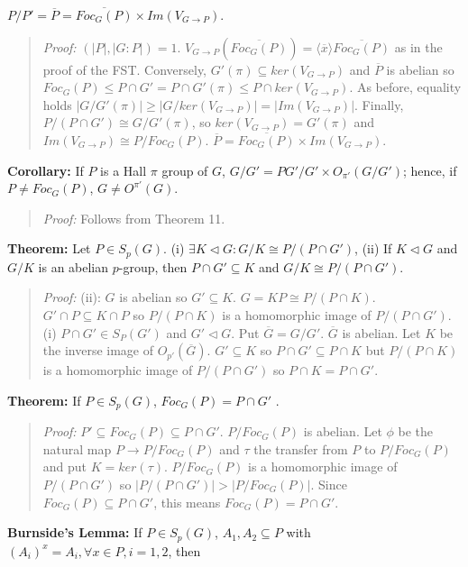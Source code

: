 $P/P' = {\overline P} = {\overline {Foc_G(P)}} \times Im(V_{G \rightarrow P})$.
\begin{quote}
\emph{Proof:}  $(|P|,|G:P|) = 1$.
$V_{G \rightarrow P} ({\overline {Foc_G(P)}}) = \langle {\overline x} \rangle {\overline {Foc_G(P)}}$ as in the
proof of the FST.  Conversely, $G'(\pi) \subseteq ker(V_{G \rightarrow P})$ and ${\overline P}$ is abelian so
$Foc_G(P) \leq P \cap G' = P \cap G'(\pi) \leq P \cap ker(V_{G \rightarrow P})$.  As before, equality holds 
$|G/G'(\pi)| \geq |G/ker(V_{G \rightarrow P})| = |Im(V_{G\rightarrow P})|$.
Finally, $P/(P \cap G') \cong G/G'(\pi)$,
so $ker(V_{G \rightarrow P}) = G'(\pi)$ and $Im(V_{G \rightarrow P}) \cong P/Foc_G(P)$.
${\overline P} = {\overline {Foc_G(P)}} \times Im(V_{G \rightarrow P})$.
\end{quote}
{\bf Corollary:} If $P$ is a Hall $\pi$
group of $G$, $G/G'= PG'/G' \times O_{\pi'}(G/G')$; hence, if $P \ne Foc_G(P)$,
$G \ne O^{\pi'}(G)$.
\begin{quote}
\emph{Proof:}  
Follows from Theorem 11.
\end{quote}
{\bf Theorem:}  Let $P \in S_p(G)$.  (i) $\exists K \lhd G: G/K \cong P/(P \cap G')$, (ii) If
$K \lhd G$ and $G/K$ is an abelian $p$-group, then $P \cap G' \subseteq K$ and $G/K \cong P/(P \cap G')$.
\begin{quote}
\emph{Proof:}
(ii): $G$ is abelian so $G' \subseteq K$.  $G=KP \cong P/(P \cap K)$. $G' \cap P \subseteq K \cap P$ so
$P/(P \cap K)$ is a homomorphic image of $P/(P \cap G')$. \\
(i) $P \cap G' \in S_P(G')$ and $G' \lhd G$.  Put ${\overline G} = G/G'$. ${\overline G}$ is abelian.  Let
$K$ be the inverse image of $O_{p'}({\overline G})$.  $G' \subseteq K$ so $P \cap G' \subseteq P \cap K$
but $P/(P \cap K)$ is a homomorphic image of $P/(P \cap G')$ so $P \cap K = P \cap G'$.
\end{quote}
{\bf Theorem:}  If $P \in S_p(G)$, $Foc_G(P) = P \cap G'$ .
\begin{quote}
\emph{Proof:} $P' \subseteq Foc_G(P) \subseteq P \cap G'$.  $P/Foc_G(P)$ is abelian.  Let $\phi$ be the
natural map $P \rightarrow P/Foc_G(P)$ and $\tau$ the transfer from $P$ to $P/Foc_G(P)$ and put
$K = ker(\tau)$.  $P/Foc_G(P)$ is a homomorphic image of $P/(P \cap G')$ so $|P/(P \cap G')| > |P/Foc_G(P)|$.
Since $Foc_G(P) \subseteq P \cap G'$, this means $Foc_G(P) = P \cap G'$.
\end{quote}
{\bf Burnside's Lemma:}  If $P \in S_p(G)$, $A_1, A_2 \subseteq P$ with 
$(A_i)^x = A_i, \forall x \in P, i= 1, 2$, then
